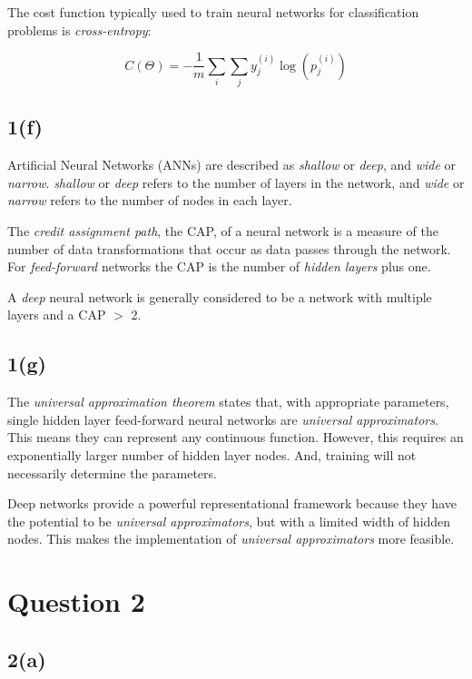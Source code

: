 \documentclass[12pt, a4paper,reqno]{article}
\begin{document}
The cost function typically used to train neural networks for classification problems is \emph{cross-entropy}:

\begin{equation}
C(\Theta) = -\frac{1}{m}\sum_{i}\sum_{j}y_j^{(i)}\log(p_j^{(i)})
\end{equation}

\subsection*{1(f)}
Artificial Neural Networks (ANNs) are described as \emph{shallow} or \emph{deep}, and \emph{wide} or \emph{narrow}. \emph{shallow} or \emph{deep} refers to the number of layers in the network, and \emph{wide} or \emph{narrow} refers to the number of nodes in each layer.

The \emph{credit assignment path}, the CAP, of a neural network is a measure of the number of data transformations that occur as data passes through the network. For \emph{feed-forward} networks the CAP is the number of \emph{hidden layers} plus one.

A \emph{deep} neural network is generally considered to be a network with multiple layers and a CAP $>$ 2.

\subsection*{1(g)}
The \emph{universal approximation theorem} states that, with appropriate parameters, single hidden layer feed-forward neural networks are \emph{universal approximators}. This means they can represent any continuous function. However, this requires an exponentially larger number of hidden layer nodes. And, training will not necessarily determine the parameters.

Deep networks provide a powerful representational framework because they have the potential to be \emph{universal approximators}, but with a limited width of hidden nodes. This makes the implementation of \emph{universal approximators} more feasible.


%
%
\clearpage\section*{Question 2}

\subsection*{2(a)}
\end{document}
